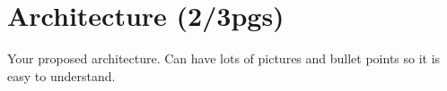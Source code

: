 
% 
% 

\section{Architecture (2/3pgs)}

Your proposed architecture. Can have lots of pictures and bullet points so it is easy to understand.
